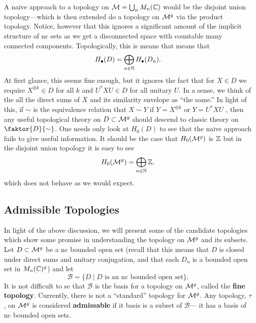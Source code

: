 A naive approach to a topology on \(\mathcal{M} = \bigcup_n M_n(\mathbb{C})\) would be the
disjoint union topology---which is then extended do a topology on \(\mathcal{M}^g\) via
the product topology. Notice, however that this ignores a significant amount of
the implicit structure of nc sets as we get a disconnected space with countable
many connected components. Topologically, this is means that means that
\[
  H_\bullet (D) = \bigoplus_{n \in \mathbb{N} } H_\bullet(D_n).
\]
At first glance, this seems fine enough, but it ignores the fact that for
\(X \in D\) we require \(X^{\oplus k} \in D\) for all \(k\) and \(U^*XU \in D\)
for all unitary \(U\). In a sense, we think of the all the direct sums of \(X\)
and its similarity envelope as ``the same.'' In light of this, if \(\sim\) is
the equivalence relation that \(X\sim Y\) if \(Y = X^{\oplus k}\) or
\(Y = U^*XU\) ,
then any useful topological theory on \(D \subset \mathcal{M}^g\) should descend to
classic theory on \(\faktor{D}{\sim}\). One needs only look at \(H_0(D)\) to see
that the naive approach fails to give useful information. It should be the case
that \(H_0(\mathcal{M}^{g} )\) is \(\mathbb{Z} \) but in the disjoint union topology it is easy
to see
\[
  H_0(\mathcal{M}^{g} ) = \bigoplus_{n \in \mathbb{N} } \mathbb{Z} ,
\]
which does not behave as we would expect.


\subsection{Admissible Topologies}%
\label{sec:admtopo}

In light of the above discussion, we will present some of the candidate
topologies which show some promise in understanding the topology on \(\mathcal{M}^g\)
and its subsets.
Let \(D \subset \mathcal{M}^{g} \) be a nc bounded open set (recall that this means that \(D\) is closed under
direct sums and unitary conjugation, and that each \(D_n\) is a bounded open set
in \(M_n(\mathbb{C})^g\)) and let
\[
  \mathcal{B} = \{D \mid  D \textrm{ is an nc bounded open set}\} .
\]
It is not difficult to se that \(\mathcal{B}\) is the basis for a topology on
\(\mathcal{M}^{g}\), called the \textbf{fine topology}. Currently, there is not a
``standard'' topology for \(\mathcal{M}^{g}\). Any topology, \(\tau\), on \(\mathcal{M}^{g}\) is
considered \textbf{admissable} if it basis is a subset of \(\mathcal{B}\)---\ie{}
it has a basis of nc bounded open sets.

